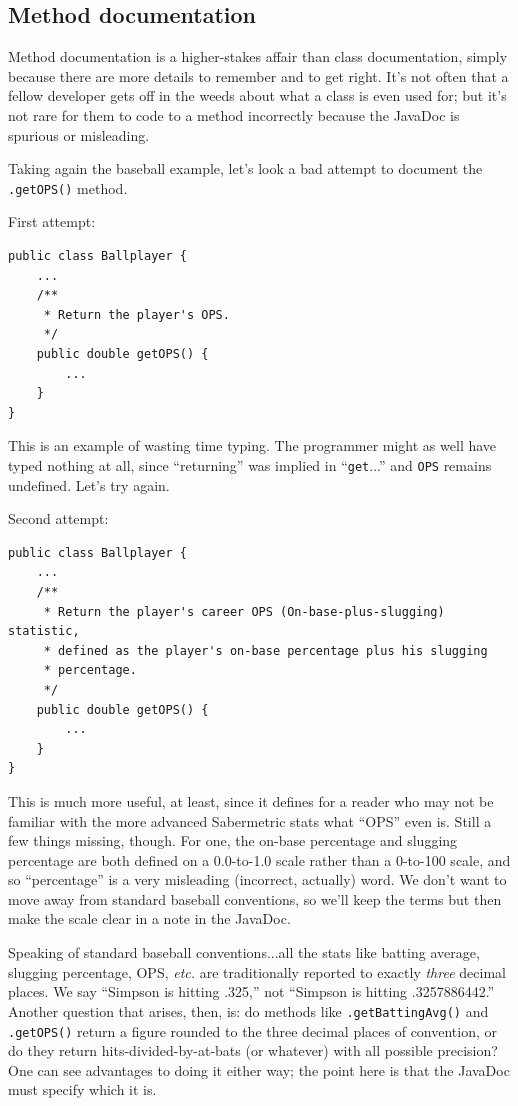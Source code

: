 \subsection{Method documentation}

Method documentation is a higher-stakes affair than class documentation,
simply because there are more details to remember and to get right. It's not
often that a fellow developer gets off in the weeds about what a class is even
used for; but it's not rare for them to code to a method incorrectly because
the JavaDoc is spurious or misleading.

Taking again the baseball example, let's look a bad attempt to document the
\texttt{.getOPS()} method.

First attempt:
\vspace{-.15in}
\begin{Verbatim}[fontsize=\small,samepage=true,frame=single]
public class Ballplayer {
    ...
    /**
     * Return the player's OPS.
     */
    public double getOPS() {
        ...
    }
}
\end{Verbatim}

This is an example of wasting time typing. The programmer might as well have
typed nothing at all, since ``returning'' was implied in ``\texttt{get}...'' and
\texttt{OPS} remains undefined. Let's try again.

Second attempt:
\vspace{-.15in}
\begin{Verbatim}[fontsize=\small,samepage=true,frame=single]
public class Ballplayer {
    ...
    /**
     * Return the player's career OPS (On-base-plus-slugging) statistic,
     * defined as the player's on-base percentage plus his slugging 
     * percentage.
     */
    public double getOPS() {
        ...
    }
}
\end{Verbatim}

This is much more useful, at least, since it defines for a reader who may not
be familiar with the more advanced Sabermetric stats what ``OPS'' even is.
Still a few things missing, though. For one, the on-base percentage and
slugging percentage are both defined on a 0.0-to-1.0 scale rather than a
0-to-100 scale, and so ``percentage'' is a very misleading (incorrect,
actually) word. We don't want to move away from standard baseball
conventions, so we'll keep the terms but then make the scale clear in a note
in the JavaDoc.

\label{batting average}
Speaking of standard baseball conventions...all the stats like batting
average, slugging percentage, OPS, \textit{etc.} are traditionally reported to
exactly \textit{three} decimal places. We say ``Simpson is hitting .325,'' not
``Simpson is hitting .3257886442.'' Another question that arises, then, is: do
methods like \texttt{.getBattingAvg()} and \texttt{.getOPS()} return a figure
rounded to the three decimal places of convention, or do they return
hits-divided-by-at-bats (or whatever) with all possible precision? One can see
advantages to doing it either way; the point here is that the JavaDoc must
specify which it is.

